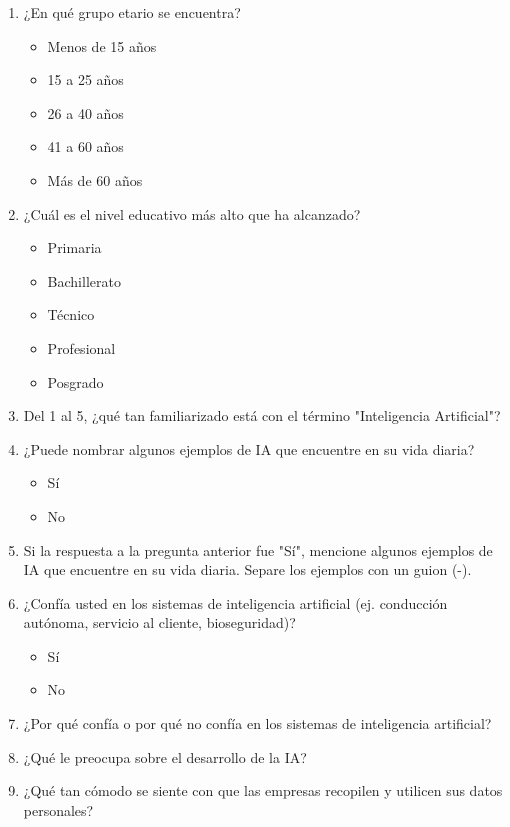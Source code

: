 \documentclass[12pt,a4paper]{article}
\begin{document}
\begin{enumerate}
    \item \label{it:p1} ¿En qué grupo etario se encuentra?
    \begin{itemize}
        \item Menos de 15 años
        \item 15 a 25 años
        \item 26 a 40 años
        \item 41 a 60 años
        \item Más de 60 años
    \end{itemize}
    \item \label{it:p2} ¿Cuál es el nivel educativo más alto que ha alcanzado?
    \begin{itemize}
        \item Primaria
        \item Bachillerato
        \item Técnico
        \item Profesional
        \item Posgrado
    \end{itemize}
    \item \label{it:p3} Del 1 al 5, ¿qué tan familiarizado está con el término "Inteligencia Artificial"?
    \item \label{it:p4} ¿Puede nombrar algunos ejemplos de IA que encuentre en su vida diaria?
    \begin{itemize}
        \item Sí
        \item No
    \end{itemize}
    \item \label{it:p5} Si la respuesta a la pregunta anterior fue "Sí", mencione algunos ejemplos de IA que 
    encuentre en su vida diaria. Separe los ejemplos con un guion (-).
    \item \label{it:p6} ¿Confía usted en los sistemas de inteligencia artificial (ej. conducción autónoma, servicio al cliente, bioseguridad)?
    \begin{itemize}
        \item Sí
        \item No
    \end{itemize}
    \item \label{it:p7} ¿Por qué confía o por qué no confía en los sistemas de inteligencia artificial?
    \item \label{it:p8} ¿Qué le preocupa sobre el desarrollo de la IA?
    \item \label{it:p9} ¿Qué tan cómodo se siente con que las empresas recopilen y utilicen sus datos personales?

\end{enumerate}
\end{document}
